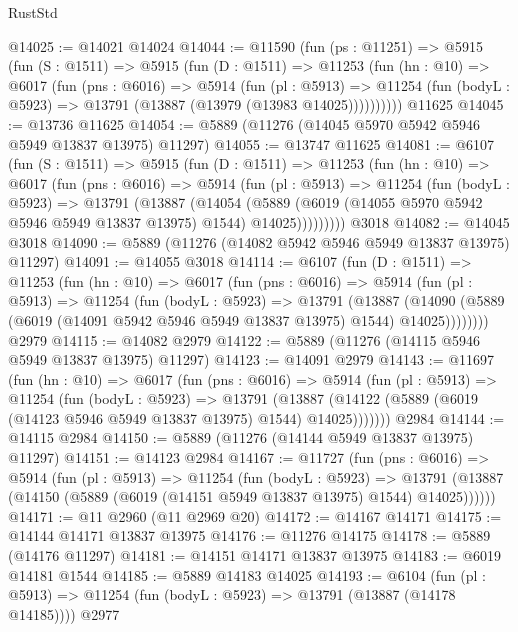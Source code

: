 \begin{lexlean}{RustStd}
\begin{coremodule}
@14025 := @14021 @14024
@14044 := @11590
    (fun (ps : @11251) =>
    @5915
      (fun (S : @1511) =>
      @5915
        (fun (D : @1511) =>
        @11253
          (fun (hn : @10) =>
          @6017
            (fun (pns : @6016) =>
            @5914
              (fun (pl : @5913) =>
              @11254 (fun (bodyL : @5923) => @13791 (@13887 (@13979 (@13983 @14025))))))))))
    @11625
@14045 := @13736 @11625
@14054 := @5889 (@11276 (@14045 @5970 @5942 @5946 @5949 @13837 @13975) @11297)
@14055 := @13747 @11625
@14081 := @6107
    (fun (S : @1511) =>
    @5915
      (fun (D : @1511) =>
      @11253
        (fun (hn : @10) =>
        @6017
          (fun (pns : @6016) =>
          @5914
            (fun (pl : @5913) =>
            @11254
              (fun (bodyL : @5923) =>
              @13791
                (@13887
                  (@14054
                    (@5889
                      (@6019 (@14055 @5970 @5942 @5946 @5949 @13837 @13975) @1544)
                      @14025)))))))))
    @3018
@14082 := @14045 @3018
@14090 := @5889 (@11276 (@14082 @5942 @5946 @5949 @13837 @13975) @11297)
@14091 := @14055 @3018
@14114 := @6107
    (fun (D : @1511) =>
    @11253
      (fun (hn : @10) =>
      @6017
        (fun (pns : @6016) =>
        @5914
          (fun (pl : @5913) =>
          @11254
            (fun (bodyL : @5923) =>
            @13791
              (@13887
                (@14090 (@5889 (@6019 (@14091 @5942 @5946 @5949 @13837 @13975) @1544) @14025))))))))
    @2979
@14115 := @14082 @2979
@14122 := @5889 (@11276 (@14115 @5946 @5949 @13837 @13975) @11297)
@14123 := @14091 @2979
@14143 := @11697
    (fun (hn : @10) =>
    @6017
      (fun (pns : @6016) =>
      @5914
        (fun (pl : @5913) =>
        @11254
          (fun (bodyL : @5923) =>
          @13791
            (@13887 (@14122 (@5889 (@6019 (@14123 @5946 @5949 @13837 @13975) @1544) @14025)))))))
    @2984
@14144 := @14115 @2984
@14150 := @5889 (@11276 (@14144 @5949 @13837 @13975) @11297)
@14151 := @14123 @2984
@14167 := @11727
    (fun (pns : @6016) =>
    @5914
      (fun (pl : @5913) =>
      @11254
        (fun (bodyL : @5923) =>
        @13791 (@13887 (@14150 (@5889 (@6019 (@14151 @5949 @13837 @13975) @1544) @14025))))))
@14171 := @11 @2960 (@11 @2969 @20)
@14172 := @14167 @14171
@14175 := @14144 @14171 @13837 @13975
@14176 := @11276 @14175
@14178 := @5889 (@14176 @11297)
@14181 := @14151 @14171 @13837 @13975
@14183 := @6019 @14181 @1544
@14185 := @5889 @14183 @14025
@14193 := @6104
    (fun (pl : @5913) => @11254 (fun (bodyL : @5923) => @13791 (@13887 (@14178 @14185))))
    @2977

\end{coremodule}
\end{lexlean}
